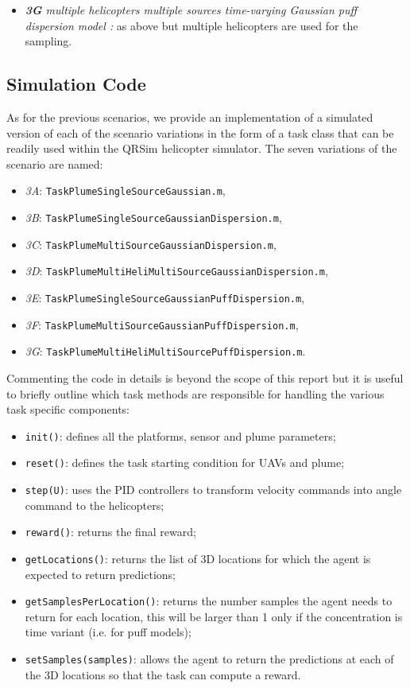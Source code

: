 \documentclass[a4paper,11pt]{report}
\newcommand{\sname}{QRSim\xspace}
\newcommand\mytexttt[1]{\texttt{\hyphenchar\font=45\relax #1}}
\begin{document}
\begin{itemize}
\item \textit{\textbf{3G} multiple helicopters multiple sources time-varying Gaussian puff dispersion model :} as above but multiple helicopters are used for the sampling.

\end{itemize}
 

\subsection{Simulation Code} \label{PlumeSim}

As for the previous scenarios, we provide an implementation of a simulated version of each of the scenario variations 
in the form of a task class that can be readily used within the \sname helicopter simulator.
The seven variations of the scenario are named:
\begin{itemize}
\item\textit{3A}: \mytexttt{TaskPlumeSingleSourceGaussian.m}, 
\item\textit{3B}: \mytexttt{TaskPlumeSingleSourceGaussianDispersion.m},
\item\textit{3C}: \mytexttt{TaskPlumeMultiSourceGaussianDispersion.m}, 
\item\textit{3D}: \mytexttt{TaskPlumeMultiHeliMultiSourceGaussianDispersion.m}, 
\item\textit{3E}: \mytexttt{TaskPlumeSingleSourceGaussianPuffDispersion.m}, 
\item\textit{3F}: \mytexttt{TaskPlumeMultiSourceGaussianPuffDispersion.m},
\item\textit{3G}: \mytexttt{TaskPlumeMultiHeliMultiSourcePuffDispersion.m}. 
\end{itemize}

Commenting the code in details is beyond the scope of this report but it is useful to briefly outline which task methods are responsible for handling the various task specific components:
\begin{itemize}
\item\mytexttt{init()}: defines all the platforms, sensor and plume parameters;
\item\mytexttt{reset()}: defines the task starting condition for UAVs and plume;
\item\mytexttt{step(U)}: uses the PID controllers to transform velocity commands into angle command to the helicopters;
\item\mytexttt{reward()}: returns the final reward;
\item\mytexttt{getLocations()}: returns the list of 3D locations for which the agent is expected to return predictions;
\item\mytexttt{getSamplesPerLocation()}: returns the number samples the agent needs to return for each location, this will be larger than 1 only if the concentration is time variant (i.e. for puff models);
\item\mytexttt{setSamples(samples)}: allows the agent to return the predictions at each of the 3D locations so that the task can compute a reward.
\end{itemize}
\end{document}
